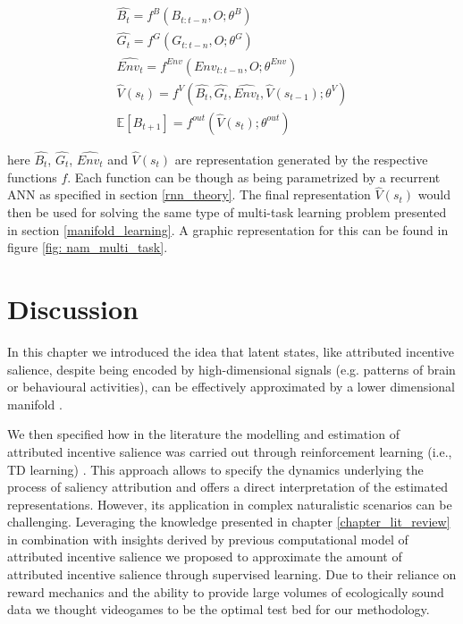 \begin{gather}
\label{nam}
    \widehat{B_t} = f^{B}(B_{t:t-n}, O;\theta^{B}) \\ \nonumber
    \widehat{G_t} = f^{G}(G_{t:t-n}, O;\theta^{G}) \\ \nonumber
    \widehat{Env_t} = f^{Env}(Env_{t:t-n}, O;\theta^{Env}) \\ \nonumber
    \widehat{V}(s_t) = f^{V}(\widehat{B_t}, \widehat{G_t}, \widehat{Env_t}, \widehat{V}(s_{t-1}); \theta^{V}) \\ \nonumber
    \mathbb{E}[{B}_{t+1}] = f^{out}(\widehat{V}(s_t); \theta^{out})
\end{gather}

here $\widehat{B_t}$, $\widehat{G_t}$, $\widehat{Env_t}$ and $\widehat{V}(s_t)$ are representation generated by the respective functions $f$. Each function can be though as being parametrized by a recurrent ANN as specified in section \ref{rnn_theory}. The final representation $\widehat{V}(s_t)$ would then be used for solving the same type of multi-task learning problem presented in section \ref{manifold_learning}. A graphic representation for this can be found in figure \ref{fig: nam_multi_task}.


\section{Discussion}
In this chapter we introduced the idea that latent states, like attributed incentive salience, despite being encoded by high-dimensional signals (e.g. patterns of brain or behavioural activities), can be effectively approximated by a lower dimensional manifold \cite{gallego2017neural, derdikman2011manifold, nieh2021geometry, bromberg2010coding, seung2000manifold, ganmor2015thesaurus, stopfer2003intensity}. 

We then specified how in the literature the modelling and estimation of attributed incentive salience was carried out through reinforcement learning (i.e., TD learning) \cite{mcclure2003computational,zhang2009neural}. This approach allows to specify the dynamics underlying the process of saliency attribution and offers a direct interpretation of the estimated representations. However, its application in complex naturalistic scenarios can be challenging. Leveraging the knowledge presented in chapter \ref{chapter_lit_review} in combination with insights derived by previous computational model of attributed incentive salience \cite{mcclure2003computational,zhang2009neural} we proposed to approximate the amount of attributed incentive salience through supervised learning. Due to their reliance on reward mechanics and the ability to provide large volumes of ecologically sound data we thought videogames to be the optimal test bed for our methodology. 


